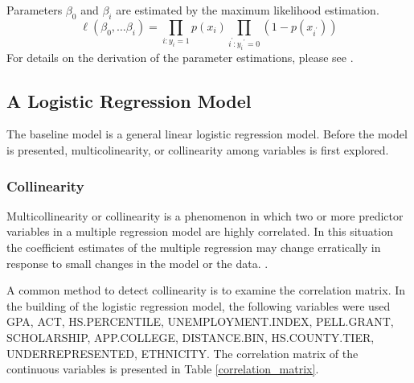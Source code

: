 \documentclass[12pt,english]{report}
\begin{document}

Parameters $\beta_0$ and $\beta_i$ are estimated by the maximum likelihood estimation.
\begin{equation}
	\ell(\beta_0,\ldots \beta_i) = \prod_{i:y_i=1} p(x_i)  \prod_{i^{'}:y_i{^{'}=0}} (1-p(x_{i^{'}}))
\end{equation}
For details on the derivation of the parameter estimations, please see \citet{hosmer2004applied}.

\subsection{A Logistic Regression Model}

The baseline model is a general linear logistic regression model.  Before the model is presented, multicolinearity, or collinearity among variables is first explored.     

\subsubsection{Collinearity }

Multicollinearity or collinearity is a phenomenon in which two or more predictor variables in a multiple regression model are highly correlated. In this situation the coefficient estimates of the multiple regression may change erratically in response to small changes in the model or the data.  \citep{belsley2005regression,Midi2010}.

A common method to detect collinearity is to examine the correlation matrix.  In the building of the logistic regression model, the following variables were used GPA, ACT, HS.PERCENTILE, UNEMPLOYMENT.INDEX, PELL.GRANT, SCHOLARSHIP, APP.COLLEGE, DISTANCE.BIN, HS.COUNTY.TIER, UNDERREPRESENTED, ETHNICITY.  The correlation matrix  of the continuous variables is presented in Table \ref{correlation_matrix}. %
\end{document}
